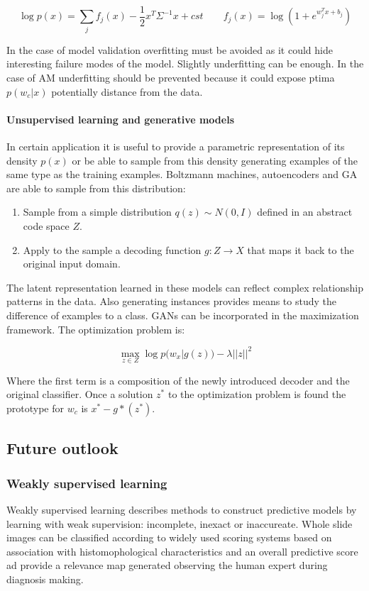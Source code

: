 		$$\log p(x) = \sum\limits_jf_j(x) - \frac{1}{2}x^T\Sigma^{-1}x + cst\qquad f_j(x) = \log(1 + e^{w_j^Tx+b_j})$$

		In the case of model validation overfitting must be avoided as it could hide interesting failure modes of the model.
		Slightly underfitting can be enough.
		In the case of AM underfitting should be prevented because it could expose ptima $p(w_c|x)$ potentially distance from the data.

			\paragraph{Unsupervised learning and generative models}
			In certain application it is useful to provide a parametric representation of its density $p(x)$ or be able to sample from this density generating examples of the same type as the training examples.
			Boltzmann machines, autoencoders and GA are able to sample from this distribution:

			\begin{enumerate}
				\item Sample from a simple distribution $q(z)\sim N(0, I)$ defined in an abstract code space $Z$.
				\item Apply to the sample a decoding function $g:Z\rightarrow X$ that maps it back to the original input domain.
			\end{enumerate}

			The latent representation learned in these models can reflect complex relationship patterns in the data.
			Also generating instances provides means to study the difference of examples to a class.
			GANs can be incorporated in the maximization framework.
			The optimization problem is:

			$$\max\limits_{z\in Z}\log p(w_x|g(z))-\lambda||z||^2$$

			Where the first term is a composition of the newly introduced decoder and the original classifier.
			Once a solution $z^*$ to the optimization problem is found the prototype for $w_c$ is $x^* - g*(z^*)$.

	\subsection{Future outlook}

		\subsubsection{Weakly supervised learning}
		Weakly supervised learning describes methods to construct predictive models by learning with weak supervision: incomplete, inexact or inaccureate.
		Whole slide images can be classified according to widely  used scoring systems based on association with histomophological characteristics and an overall predictive score ad provide a relevance map generated observing the human expert during diagnosis making.

